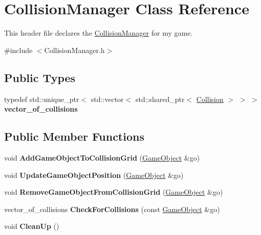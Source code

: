\hypertarget{class_collision_manager}{}\section{Collision\+Manager Class Reference}
\label{class_collision_manager}


This header file declares the \hyperlink{class_collision_manager}{Collision\+Manager} for my game.  




{\ttfamily \#include $<$Collision\+Manager.\+h$>$}

\subsection*{Public Types}
\begin{DoxyCompactItemize}
\item 
\hypertarget{class_collision_manager_a41e4913345084ce048c9c8ad96bdeafe}{}typedef std\+::unique\+\_\+ptr$<$ std\+::vector$<$ std\+::shared\+\_\+ptr$<$ \hyperlink{class_collision}{Collision} $>$ $>$ $>$ {\bfseries vector\+\_\+of\+\_\+collisions}\label{class_collision_manager_a41e4913345084ce048c9c8ad96bdeafe}

\end{DoxyCompactItemize}
\subsection*{Public Member Functions}
\begin{DoxyCompactItemize}
\item 
\hypertarget{class_collision_manager_a8080db3a454be3b32505713bc6c3b1b3}{}void {\bfseries Add\+Game\+Object\+To\+Collision\+Grid} (\hyperlink{class_game_object}{Game\+Object} \&go)\label{class_collision_manager_a8080db3a454be3b32505713bc6c3b1b3}

\item 
\hypertarget{class_collision_manager_aa58022d2f80eb264c6f66e92a7209cf8}{}void {\bfseries Update\+Game\+Object\+Position} (\hyperlink{class_game_object}{Game\+Object} \&go)\label{class_collision_manager_aa58022d2f80eb264c6f66e92a7209cf8}

\item 
\hypertarget{class_collision_manager_ac1b05ae3761a90c75820edece9c7f938}{}void {\bfseries Remove\+Game\+Object\+From\+Collision\+Grid} (\hyperlink{class_game_object}{Game\+Object} \&go)\label{class_collision_manager_ac1b05ae3761a90c75820edece9c7f938}

\item 
\hypertarget{class_collision_manager_adb6ac040ca57dd43a1cff9e04ab3ab9d}{}vector\+\_\+of\+\_\+collisions {\bfseries Check\+For\+Collisions} (const \hyperlink{class_game_object}{Game\+Object} \&go)\label{class_collision_manager_adb6ac040ca57dd43a1cff9e04ab3ab9d}

\item 
\hypertarget{class_collision_manager_a3b1e3278a8aa71146b3cbb83e8f88d6b}{}void {\bfseries Clean\+Up} ()\label{class_collision_manager_a3b1e3278a8aa71146b3cbb83e8f88d6b}

\end{DoxyCompactItemize}


